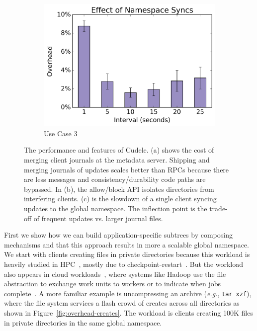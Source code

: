 \begin{figure}[t]
\begin{subfigure}[b]{.3\linewidth}
      \includegraphics[width=1.0\linewidth]{graphs/slowdown-sync.png}
      \caption{Use Case 3}
      \label{fig:slowdown-sync}
  \end{subfigure}
\caption{The performance and features of Cudele. (a) shows the cost of
merging client journals at the metadata server. Shipping and merging journals of updates scales better than RPCs
because there are less messages and consistency/durability code paths are
bypassed. In (b), the allow/block API isolates directories from interfering
clients. (c) is the slowdown of a single client syncing updates to the global
namespace. The inflection point is the trade-off of frequent updates vs. larger
journal files.\label{fig:use-cases}}
\end{figure}

First we show how we can build application-specific subtrees by composing
mechanisms and that this approach results in more a scalable global namespace.
We start with clients creating files in private directories because this
workload is heavily studied in HPC~\cite{weil:sc2004-dyn-metadata,
ren:sc2014-indexfs, patil:fast2011-giga, zheng:pdsw2014-batchfs,
sevilla:sc15-mantle}, mostly due to checkpoint-restart~\cite{bent_plfs_2009}.
But the workload also appears in cloud workloads~\cite{xiao:socc15-shardfs},
where systems like Hadoop use the file abstraction to exchange work units to
workers or to indicate when jobs
complete~\cite{shvachko:login2012-hdfs-scalability}. A more familiar example is
uncompressing an archive ({\it e.g.}, \texttt{tar xzf}), where the file system
services a flash crowd of creates across all directories as shown in
Figure~\ref{fig:overhead-creates}.  The workload is clients creating 100K files
in private directories in the same global namespace.

